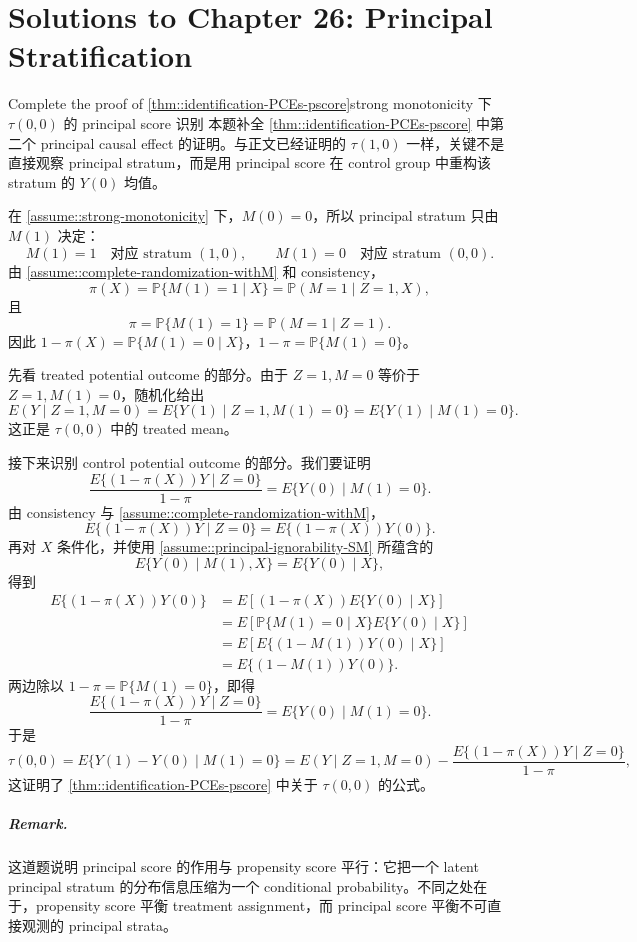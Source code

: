 \chapter{Solutions to Chapter 26: Principal Stratification}\label{sol:chapter26}

\begin{exercisesolution}{Complete the proof of \cref{thm::identification-PCEs-pscore}}{strong monotonicity 下 $\tau(0,0)$ 的 principal score 识别}
本题补全 \cref{thm::identification-PCEs-pscore} 中第二个 principal causal effect 的证明。与正文已经证明的 $\tau(1,0)$ 一样，关键不是直接观察 principal stratum，而是用 principal score 在 control group 中重构该 stratum 的 $Y(0)$ 均值。

在 \cref{assume::strong-monotonicity} 下，$M(0)=0$，所以 principal stratum 只由 $M(1)$ 决定：
\[
M(1)=1 \quad \text{对应 stratum } (1,0),
\qquad
M(1)=0 \quad \text{对应 stratum } (0,0).
\]
由 \cref{assume::complete-randomization-withM} 和 consistency，
\[
\pi(X)=\mathbb{P}\{M(1)=1\mid X\}
=\mathbb{P}(M=1\mid Z=1,X),
\]
且
\[
\pi=\mathbb{P}\{M(1)=1\}=\mathbb{P}(M=1\mid Z=1).
\]
因此 $1-\pi(X)=\mathbb{P}\{M(1)=0\mid X\}$，$1-\pi=\mathbb{P}\{M(1)=0\}$。

先看 treated potential outcome 的部分。由于 $Z=1,M=0$ 等价于 $Z=1,M(1)=0$，随机化给出
\[
E(Y\mid Z=1,M=0)
=E\{Y(1)\mid Z=1,M(1)=0\}
=E\{Y(1)\mid M(1)=0\}.
\]
这正是 $\tau(0,0)$ 中的 treated mean。

接下来识别 control potential outcome 的部分。我们要证明
\[
\frac{E\{(1-\pi(X))Y\mid Z=0\}}{1-\pi}
=E\{Y(0)\mid M(1)=0\}.
\]
由 consistency 与 \cref{assume::complete-randomization-withM}，
\[
E\{(1-\pi(X))Y\mid Z=0\}
=E\{(1-\pi(X))Y(0)\}.
\]
再对 $X$ 条件化，并使用 \cref{assume::principal-ignorability-SM} 所蕴含的
\[
E\{Y(0)\mid M(1),X\}=E\{Y(0)\mid X\},
\]
得到
\begin{align*}
E\{(1-\pi(X))Y(0)\}
&=
E\left[(1-\pi(X))E\{Y(0)\mid X\}\right]\\
&=
E\left[\mathbb{P}\{M(1)=0\mid X\}E\{Y(0)\mid X\}\right]\\
&=
E\left[E\{(1-M(1))Y(0)\mid X\}\right]\\
&=
E\{(1-M(1))Y(0)\}.
\end{align*}
两边除以 $1-\pi=\mathbb{P}\{M(1)=0\}$，即得
\[
\frac{E\{(1-\pi(X))Y\mid Z=0\}}{1-\pi}
=E\{Y(0)\mid M(1)=0\}.
\]
于是
\[
\tau(0,0)
=E\{Y(1)-Y(0)\mid M(1)=0\}
=E(Y\mid Z=1,M=0)
-\frac{E\{(1-\pi(X))Y\mid Z=0\}}{1-\pi},
\]
这证明了 \cref{thm::identification-PCEs-pscore} 中关于 $\tau(0,0)$ 的公式。

\paragraph{Remark.}
这道题说明 principal score 的作用与 propensity score 平行：它把一个 latent principal stratum 的分布信息压缩为一个 conditional probability。不同之处在于，propensity score 平衡 treatment assignment，而 principal score 平衡不可直接观测的 principal strata。
\end{exercisesolution}

